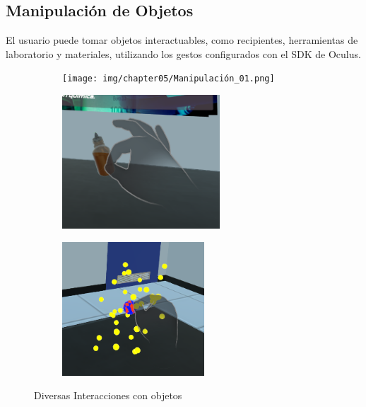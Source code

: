 \subsection{Manipulación de Objetos}
El usuario puede tomar objetos interactuables, como recipientes, herramientas de laboratorio y materiales, utilizando los gestos configurados con el SDK de Oculus. 
\begin{figure}[thbp]
    \centering
    \begin{subfigure}[b]{0.4\linewidth}
        \texttt{[image: img/chapter05/Manipulación\_01.png]}
    \end{subfigure}
    \begin{subfigure}[b]{0.4\linewidth}
        \includegraphics[width=\linewidth, height = 5cm]{img/chapter05/Pinch (2).png}
    \end{subfigure}
    \begin{subfigure}[b]{0.4\linewidth}
        \includegraphics[width=\linewidth, height = 5cm]{img/chapter05/Agarre.png}
    \end{subfigure}
    \caption{Diversas Interacciones con objetos}
\end{figure}
\newpage
